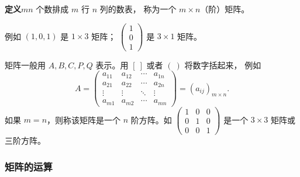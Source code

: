 \documentclass[UTF8,11pt]{ctexart}
\theoremstyle{cnthm}
\begin{document}
\textbf{定义}\quad $mn$ 个数排成 $m$ 行 $n$ 列的数表，
称为一个 $m\times n$（阶）矩阵。

例如 $(1,0,1)$ 是 $1\times3$ 矩阵；
$\begin{pmatrix}1\\0\\1\end{pmatrix}$ 是 $3\times1$ 矩阵。

矩阵一般用 $A,B,C,P,Q$ 表示。用 $[\ ]$ 或者 $(\ )$ 将数字括起来，
例如
\[
A=
\begin{pmatrix}
a_{11} & a_{12} & \cdots & a_{1n}\\
a_{21} & a_{22} & \cdots & a_{2n}\\
\vdots & \vdots & \ddots & \vdots\\
a_{m1} & a_{m2} & \cdots & a_{mn}
\end{pmatrix}
=(a_{ij})_{m\times n}.
\]
如果 $m=n$，则称该矩阵是一个 $n$ 阶方阵。如
$\begin{pmatrix}1&0&0\\0&1&0\\0&0&1\end{pmatrix}$
是一个 $3\times3$ 矩阵或三阶方阵。

\subsubsection*{矩阵的运算}
\end{document}
